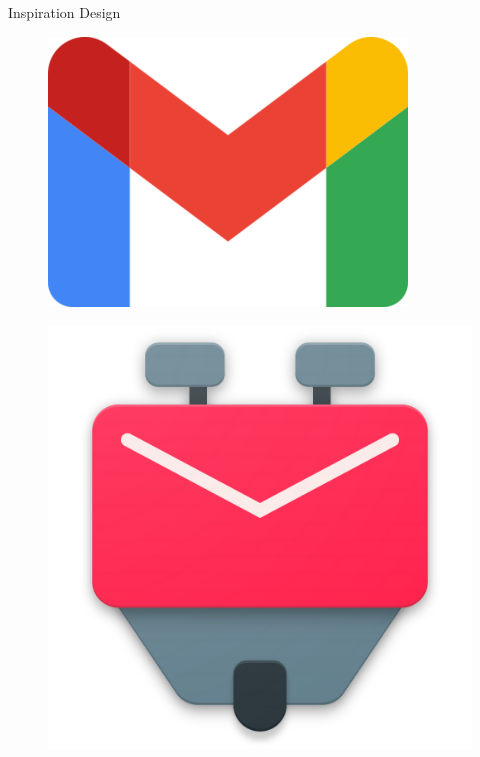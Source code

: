 \documentclass[aspectratio=169]{beamer}
\begin{document}
\begin{frame}{Inspiration Design}
\begin{varwidth}{.3\textwidth}\pause
        \begin{figure}
            \centering
            \includegraphics[width=.9\textwidth]{media/gmail-logo.png}
        \end{figure}
    \end{varwidth}
    \hfill
    \begin{varwidth}{.3\textwidth}\pause
        \begin{figure}
        \centering
        \includegraphics[width=.9\textwidth]{media/k9-logo.png}

\end{figure}
\end{varwidth}
\end{frame}
\end{document}
